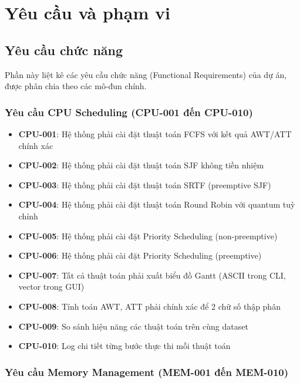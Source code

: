 
\chapter{Yêu cầu và phạm vi}
\label{ch:requirements}

\section{Yêu cầu chức năng}

Phần này liệt kê các yêu cầu chức năng (Functional Requirements) của dự án, 
được phân chia theo các mô-đun chính.

\subsection{Yêu cầu CPU Scheduling (CPU-001 đến CPU-010)}

\begin{itemize}[leftmargin=1.5cm]
  \item \textbf{CPU-001}: Hệ thống phải cài đặt thuật toán FCFS với kết quả AWT/ATT chính xác
  \item \textbf{CPU-002}: Hệ thống phải cài đặt thuật toán SJF không tiền nhiệm
  \item \textbf{CPU-003}: Hệ thống phải cài đặt thuật toán SRTF (preemptive SJF)
  \item \textbf{CPU-004}: Hệ thống phải cài đặt thuật toán Round Robin với quantum tuỳ chỉnh
  \item \textbf{CPU-005}: Hệ thống phải cài đặt Priority Scheduling (non-preemptive)
  \item \textbf{CPU-006}: Hệ thống phải cài đặt Priority Scheduling (preemptive)
  \item \textbf{CPU-007}: Tất cả thuật toán phải xuất biểu đồ Gantt (ASCII trong CLI, vector trong GUI)
  \item \textbf{CPU-008}: Tính toán AWT, ATT phải chính xác để 2 chữ số thập phân
  \item \textbf{CPU-009}: So sánh hiệu năng các thuật toán trên cùng dataset
  \item \textbf{CPU-010}: Log chi tiết từng bước thực thi mỗi thuật toán
\end{itemize}

\subsection{Yêu cầu Memory Management (MEM-001 đến MEM-010)}

